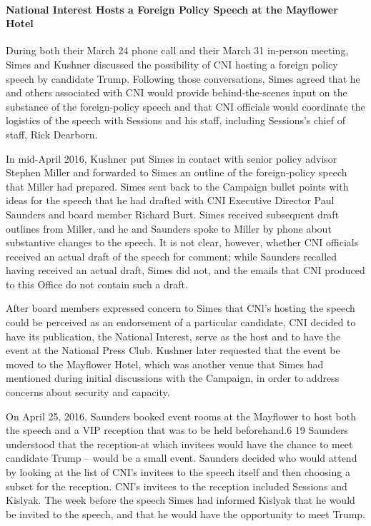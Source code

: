 \paragraph{National Interest Hosts a Foreign Policy Speech at the Mayflower Hotel}

During both their March 24 phone call and their March 31 in-person meeting, Simes and Kushner discussed the possibility of CNI hosting a foreign policy speech by candidate Trump.%
Following those conversations, Simes agreed that he and others associated with CNI would provide behind-the-scenes input on the substance of the foreign-policy speech and that CNI officials would coordinate the logistics of the speech with Sessions and his staff, including Sessions's chief of staff, Rick Dearborn.%

In mid-April 2016, Kushner put Simes in contact with senior policy advisor Stephen Miller and forwarded to Simes an outline of the foreign-policy speech that Miller had prepared.%
Simes sent back to the Campaign bullet points with ideas for the speech that he had drafted with CNI Executive Director Paul Saunders and board member Richard Burt.%
Simes received subsequent draft outlines from Miller, and he and Saunders spoke to Miller by phone about substantive changes to the speech.%
It is not clear, however, whether CNI officials received an actual draft of the speech for comment; while Saunders recalled having received an actual draft, Simes did not, and the emails that CNI produced to this Office do not contain such a draft.%

After board members expressed concern to Simes that CNl's hosting the speech could be perceived as an endorsement of a particular candidate, CNI decided to have its publication, the National Interest, serve as the host and to have the event at the National Press Club.%
Kushner later requested that the event be moved to the Mayflower Hotel, which was another venue that Simes had mentioned during initial discussions with the Campaign, in order to address concerns about security and capacity.%

On April 25, 2016, Saunders booked event rooms at the Mayflower to host both the speech and a VIP reception that was to be held beforehand.6 19 Saunders understood that the reception-at which invitees would have the chance to meet candidate Trump -- would be a small event.%
Saunders decided who would attend by looking at the list of CNI's invitees to the speech itself and then choosing a subset for the reception.%
CNI's invitees to the reception included Sessions and Kislyak.%
The week before the speech Simes had informed Kislyak that he would be invited to the speech, and that he would have the opportunity to meet Trump.%


